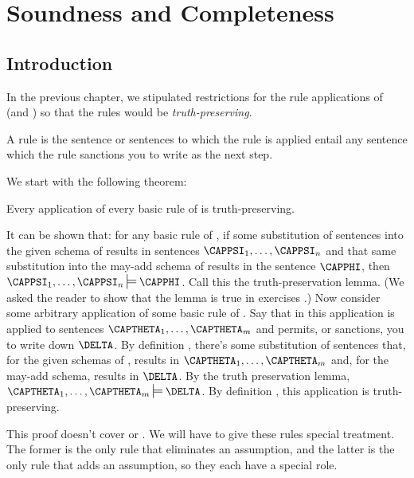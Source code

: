 
\chapter{Soundness and Completeness}\label{completenesschapter}

\section{Introduction}

In the previous chapter, we stipulated restrictions for the rule applications of \GSD{} (and \GQD{}) so that the rules would be \emph{truth-preserving}.

\begin{majorILnc}{}
	A rule is  \Iff the sentence or sentences to which the rule is applied entail any sentence which the rule  sanctions you to write as the next step. 
\end{majorILnc}

We start with the following theorem:
\begin{THEOREM}{}
	Every application of every basic rule of \GSD{} is truth-preserving.
\end{THEOREM}
\begin{PROOF}
	It can be shown that: for any basic rule  of \GSD{}, if some substitution of \GSL{} sentences into the given schema of  results in \GSL{} sentences $\CAPPSI_1,\ldots,\CAPPSI_{\integer{n}}$ and that same substitution into the may-add schema of  results in the \GSL{} sentence $\CAPPHI$, then $\CAPPSI_1,\ldots,\CAPPSI_{\integer{n}}\sdtstile{}{}\CAPPHI$.
	Call this the truth-preservation lemma.
	(We asked the reader to show that the lemma is true in exercises .)
	Now consider some arbitrary application of some basic rule  of \GSD{}. 
	Say that in this application  is applied to sentences $\CAPTHETA_1,\ldots,\CAPTHETA_{\integer{m}}$ and permits, or sanctions, you to write down $\DELTA$. 
	By definition , there's some substitution of \GSL{} sentences that, for the given schemas of , results in $\CAPTHETA_1,\ldots,\CAPTHETA_{\integer{m}}$ and, for the may-add schema, results in $\DELTA$. 
	By the truth preservation lemma, $\CAPTHETA_1,\ldots,\CAPTHETA_{\integer{m}}\sdtstile{}{}\DELTA$.
	By definition , this application is truth-preserving. 
	
	This proof doesn't cover  or .  We will have to give these rules special treatment.  The former is the only rule that eliminates an assumption, and the latter is the only rule that adds an assumption, so they each have a special role.
\end{PROOF}

